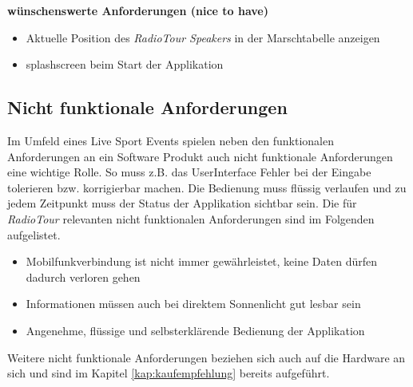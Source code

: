 \textbf{wünschenswerte Anforderungen (nice to have)}
\begin{itemize}
\item Aktuelle Position des \textit{RadioTour Speakers} in der Marschtabelle anzeigen
\item \gls{splashscreen} beim Start der Applikation
\end{itemize}

\subsection{Nicht funktionale Anforderungen}
Im Umfeld eines Live Sport Events spielen neben den funktionalen Anforderungen an ein Software Produkt auch nicht funktionale Anforderungen eine wichtige Rolle. So muss z.B. das UserInterface Fehler bei der Eingabe tolerieren bzw. korrigierbar machen. Die Bedienung muss flüssig verlaufen und zu jedem Zeitpunkt muss der Status der Applikation sichtbar sein. Die für \textit{RadioTour} relevanten nicht funktionalen Anforderungen sind im Folgenden aufgelistet.

\begin{itemize}
\item Mobilfunkverbindung ist nicht immer gewährleistet, keine Daten dürfen dadurch verloren gehen
\item Informationen müssen auch bei direktem Sonnenlicht gut lesbar sein
\item Angenehme, flüssige und selbsterklärende Bedienung der Applikation
\end{itemize}

Weitere nicht funktionale Anforderungen beziehen sich auch auf die Hardware an sich und sind im Kapitel \ref{kap:kaufempfehlung} bereits aufgeführt.

